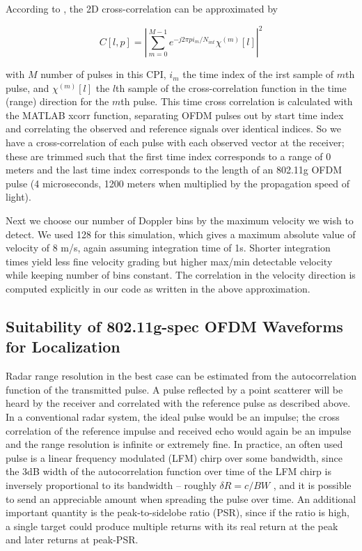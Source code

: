 \documentclass[article,11pt,onecolumn,final]{IEEEtran}
\begin{document}
According to \cite{Colone2012}, the 2D cross-correlation can be approximated by

\begin{equation} \label{eq:2dccapprox}
 C[l, p] = |\sum\limits_{m=0}^{M-1}e^{-j2\pi pi_m/N_{int}}\chi^{(m)}[l]|^2 
\end{equation}

with $M$ number of pulses in this CPI, $i_m$ the time index of the irst sample of $m$th pulse, and $\chi^{(m)}[l]$ the $l$th sample of the cross-correlation function in the time (range) direction for the $m$th pulse. This time cross correlation is calculated with the MATLAB xcorr function, separating OFDM pulses out by start time index and correlating the observed and reference signals over identical indices. So we have a cross-correlation of each pulse with each observed vector at the receiver; these are trimmed such that the first time index corresponds to a range of 0 meters and the last time index corresponds to the length of an 802.11g OFDM pulse (4 microseconds, 1200 meters when multiplied by the propagation speed of light).

Next we choose our number of Doppler bins by the maximum velocity we wish to detect. We used 128 for this simulation, which gives a maximum absolute value of velocity of 8 m/s, again assuming integration time of 1s. Shorter integration times yield less fine velocity grading but higher max/min detectable velocity while keeping number of bins constant. The correlation in the velocity direction is computed explicitly in our code as written in the above approximation.

\subsection{Suitability of 802.11g-spec OFDM Waveforms for Localization}
Radar range resolution in the best case can be estimated from the autocorrelation function of the transmitted pulse. A pulse reflected by a point scatterer will be heard by the receiver and correlated with the reference pulse as described above. In a conventional radar system, the ideal pulse would be an impulse; the cross correlation of the reference impulse and received echo would again be an impulse and the range resolution is infinite or extremely fine. In practice, an often used pulse is a linear frequency modulated (LFM) chirp over some bandwidth, since the 3dB width of the autocorrelation function over time of the LFM chirp is inversely proportional to its bandwidth -- roughly $\delta R = c / BW$ \cite{RadarBook}, and it is possible to send an appreciable amount when spreading the pulse over time. An additional important quantity is the peak-to-sidelobe ratio (PSR), since if the ratio is high, a single target could produce multiple returns with its real return at the peak and later returns at peak-PSR.
\end{document}
